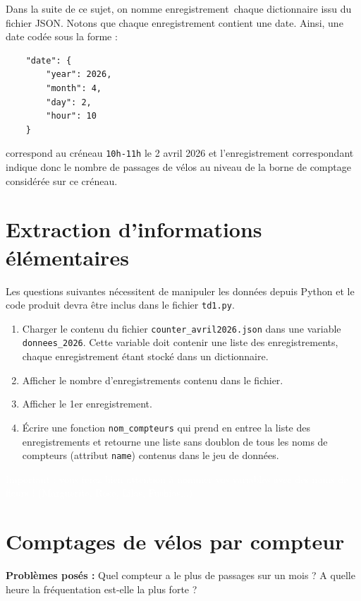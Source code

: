 \documentclass[11pt,a4paper]{article}
\begin{document}
Dans la suite de ce sujet, on nomme \og enregistrement\fg ~chaque dictionnaire issu du fichier JSON.
Notons que chaque enregistrement contient une date. Ainsi, une date codée sous la forme :
\begin{verbatim}
    "date": {
        "year": 2026,
        "month": 4,
        "day": 2,
        "hour": 10
    }
\end{verbatim}

\noindent
correspond au créneau \verb+10h-11h+ le 2 avril 2026 et l'enregistrement correspondant indique donc le nombre de passages de vélos au niveau de la borne de comptage considérée sur ce créneau.


\section{Extraction d'informations élémentaires}

Les questions suivantes nécessitent de manipuler les données depuis Python et le code produit devra être inclus dans le fichier \verb+td1.py+.

\begin{enumerate}
\item Charger le contenu du fichier \verb+counter_avril2026.json+ dans une variable \verb+donnees_2026+. Cette variable doit contenir une liste des enregistrements, chaque enregistrement étant stocké dans un dictionnaire.

\item Afficher le nombre d'enregistrements contenu dans le fichier.
\item Afficher le 1er enregistrement.

\item Écrire une fonction \verb+nom_compteurs+ qui prend en entree la liste des enregistrements et retourne une liste sans doublon de tous les noms de compteurs (attribut \verb+name+) contenus dans le jeu de données.
\end{enumerate}

\textcolor{white}{\begin{tiny}
Important : vous ferez bien attention à nommer vos variables avec des noms de fleurs ! (Marguerite, Rose, Lilas, Fushias...)
\end{tiny}}
\section{Comptages de vélos par compteur}

\textbf{Problèmes posés :} Quel compteur a le plus de passages sur un mois ? A quelle heure la fréquentation est-elle la plus forte ?
\end{document}
